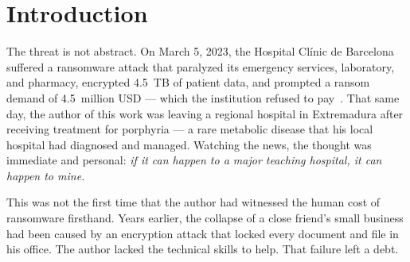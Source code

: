 \documentclass[11pt,a4paper]{article}
\begin{document}
\begin{abstract}
These results demonstrate architectural feasibility under controlled replay conditions rather
than universal detection capability. The evaluation covers a single botnet scenario from 2011
with synthetic-trained classifiers; generalizability to modern ransomware, DDoS variants, and
encrypted C2 traffic has not been empirically established and is discussed in
Section~\ref{sec:limitations}. Behavioral indicators associated with ransomware propagation
and lateral-movement patterns are detected in the Neris scenario; direct evaluation against
post-2020 ransomware families remains Future Work~\S\ref{sec:future:corpus}.

All experiments were conducted in a reproducible Vagrant/VirtualBox environment running on a
consumer laptop, ensuring result accessibility and independent reproducibility.

This work was developed through a structured multi-model AI collaboration methodology ---
the \emph{Consejo de Sabios} (Council of Wise Men), a multi-LLM peer review methodology ---
documented in Section~\ref{sec:consejo}. ML Defender is released under the MIT license.
\end{abstract}

\tableofcontents
\newpage

\section{Introduction}

The threat is not abstract. On March 5, 2023, the Hospital Cl\'inic de Barcelona suffered a
ransomware attack that paralyzed its emergency services, laboratory, and pharmacy, encrypted
4.5~TB of patient data, and prompted a ransom demand of 4.5~million USD --- which the
institution refused to pay~\cite{incibe2023}. That same day, the author of this work was
leaving a regional hospital in Extremadura after receiving treatment for porphyria --- a rare
metabolic disease that his local hospital had diagnosed and managed. Watching the news, the
thought was immediate and personal: \emph{if it can happen to a major teaching hospital, it
can happen to mine.}

This was not the first time that the author had witnessed the human cost of ransomware
firsthand. Years earlier, the collapse of a close friend's small business had been caused by
an encryption attack that locked every document and file in his office. The author lacked the
technical skills to help. That failure left a debt.
\end{document}
